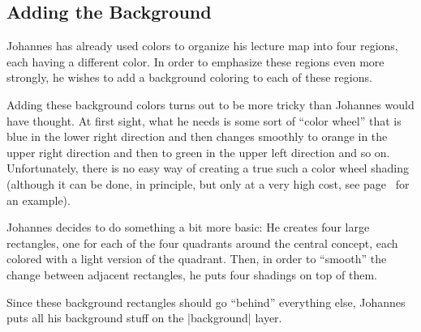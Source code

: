 \subsection{Adding the Background}

Johannes has already used colors to organize his lecture map into four
regions, each having a different color. In order to emphasize these
regions even more strongly, he wishes to add a background coloring to
each of these regions.

Adding these background colors turns out to be more tricky than
Johannes would have thought. At first sight, what he needs is some
sort of ``color wheel'' that is blue in the lower right direction and
then changes smoothly to orange in the upper right direction and then
to green in the upper left direction and so on. Unfortunately, there
is no easy way of creating a true such a color wheel shading (although
it can be done, in principle, but only at a very high cost, see
page~\pageref{shading-color-wheel} for an example).

Johannes decides to do something a bit more basic: He creates four
large rectangles, one for each of the four quadrants around the
central concept, each colored with a light version of the
quadrant. Then, in order to ``smooth'' the change between adjacent
rectangles, he puts four shadings on top of them.

Since these background rectangles should go ``behind'' everything
else, Johannes puts all his background stuff on the |background|
layer.

